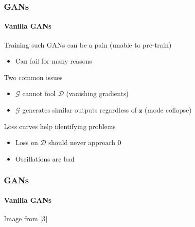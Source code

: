 \documentclass[xetex,professionalfont]{beamer}
\renewcommand\emph[1]{\textcolor{tuwcvl_cvl_blue}{#1}}
\renewcommand{\vec}[1]{\ensuremath{\mathbf{#1}}}
\newcommand{\vz}{\vec{z}}
\newcommand{\cD}{\mathcal{D}}
\newcommand{\cG}{\mathcal{G}}
\begin{document}
\begin{frame}
	\frametitle{GANs}
	\framesubtitle{Vanilla GANs}

	Training such GANs can be a pain (unable to pre-train)
	\begin{itemize}
		\item Can fail for many reasons
	\end{itemize}

	\bigskip

	Two common issues
	\begin{itemize}
		\item $\cG$ cannot fool $\cD$ (vanishing gradients)
		\item $\cG$ generates similar outputs regardless of $\vz$ (\emph{mode collapse}) %
	\end{itemize}

	\bigskip

	Loss curves help identifying problems
	\begin{itemize}
		\item Loss on $\cD$ should never approach $0$
		\item Oscillations are bad
	\end{itemize}

\end{frame}


\begin{frame}
	\frametitle{GANs}
	\framesubtitle{Vanilla GANs}

	\begin{center}
		{\centering Image from [3]}
	\end{center}

\end{frame}
\end{document}
